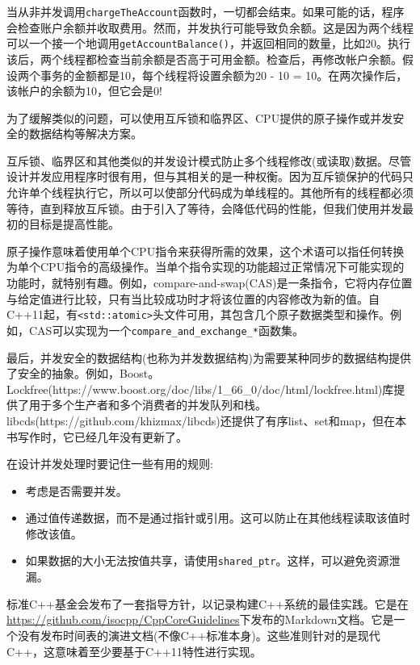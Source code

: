当从非并发调用\texttt{chargeTheAccount}函数时，一切都会结束。如果可能的话，程序会检查账户余额并收取费用。然而，并发执行可能导致负余额。这是因为两个线程可以一个接一个地调用\texttt{getAccountBalance()}，并返回相同的数量，比如20。执行该后，两个线程都检查当前余额是否高于可用金额。检查后，再修改帐户余额。假设两个事务的金额都是10，每个线程将设置余额为20 - 10 = 10。在两次操作后，该帐户的余额为10，但它会是0!

为了缓解类似的问题，可以使用互斥锁和临界区、CPU提供的原子操作或并发安全的数据结构等解决方案。

互斥锁、临界区和其他类似的并发设计模式防止多个线程修改(或读取)数据。尽管设计并发应用程序时很有用，但与其相关的是一种权衡。因为互斥锁保护的代码只允许单个线程执行它，所以可以使部分代码成为单线程的。其他所有的线程都必须等待，直到释放互斥锁。由于引入了等待，会降低代码的性能，但我们使用并发最初的目标是提高性能。

原子操作意味着使用单个CPU指令来获得所需的效果，这个术语可以指任何转换为单个CPU指令的高级操作。当单个指令实现的功能超过正常情况下可能实现的功能时，就特别有趣。例如，compare-and-swap(CAS)是一条指令，它将内存位置与给定值进行比较，只有当比较成功时才将该位置的内容修改为新的值。自C++11起，有\texttt{<std::atomic>}头文件可用，其包含几个原子数据类型和操作。例如，CAS可以实现为一个\texttt{compare\_and\_exchange\_*}函数集。

最后，并发安全的数据结构(也称为并发数据结构)为需要某种同步的数据结构提供了安全的抽象。例如，Boost。Lockfree(https://www.boost.org/doc/libs/1\_66\_0/doc/html/lockfree.html)库提供了用于多个生产者和多个消费者的并发队列和栈。 libcds(https://github.com/khizmax/libcds)还提供了有序list、set和map，但在本书写作时，它已经几年没有更新了。

在设计并发处理时要记住一些有用的规则:

\begin{itemize}
\item 
考虑是否需要并发。

\item 
通过值传递数据，而不是通过指针或引用。这可以防止在其他线程读取该值时修改该值。

\item 
如果数据的大小无法按值共享，请使用\texttt{shared\_ptr}。这样，可以避免资源泄漏。
\end{itemize}


标准C++基金会发布了一套指导方针，以记录构建C++系统的最佳实践。它是在\url{https://github.com/isocpp/CppCoreGuidelines}下发布的Markdown文档。它是一个没有发布时间表的演进文档(不像C++标准本身)。这些准则针对的是现代C++，这意味着至少要基于C++11特性进行实现。

